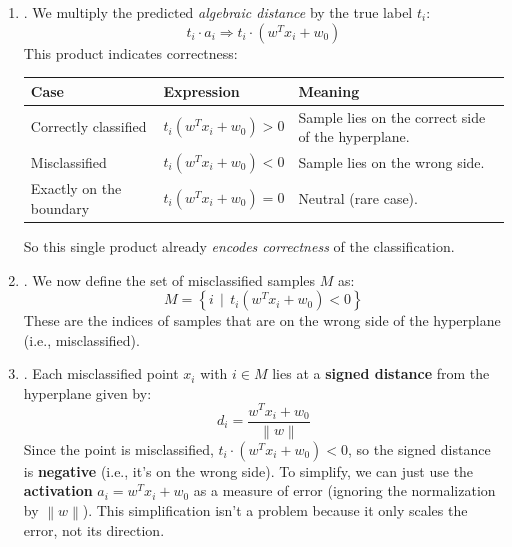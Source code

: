 \begin{enumerate}
    \item {}. We multiply the predicted \emph{algebraic distance} by the true label $t_i$:
    \begin{equation*}
        t_i \cdot a_i \Rightarrow t_i \cdot \left(w^{T} x_i + w_{0}\right)
    \end{equation*}
    This product indicates correctness:
    \begin{table}[!htp]
        \centering
        \begin{tabular}{@{} l l p{12em} @{}}
            \toprule
            \textbf{Case} & \textbf{Expression} & \textbf{Meaning} \\
            \midrule
            Correctly classified    & $t_i \left(w^{T} x_{i} + w_0\right) > 0$ & Sample lies on the correct side of the hyperplane. \\[.3em]
            Misclassified           & $t_i \left(w^{T} x_{i} + w_0\right) < 0$ & Sample lies on the wrong side. \\[.3em]
            Exactly on the boundary & $t_i \left(w^{T} x_{i} + w_0\right) = 0$ & Neutral (rare case). \\
            \bottomrule
        \end{tabular}
    \end{table}

    So this single product already \emph{encodes correctness} of the classification.


    \item {}. We now define the set of misclassified samples $M$ as:
    \begin{equation*}
        M = \left\{ i \, \mid \, t_i \left(w^{T} x_{i} + w_0\right) < 0 \right\}
    \end{equation*}
    These are the indices of samples that are on the wrong side of the hyperplane (i.e., misclassified).


    \item {}. Each misclassified point $x_i$ with $i \in M$ lies at a \textbf{signed distance} from the hyperplane given by:
    \begin{equation*}
        d_i = \dfrac{w^{T} x_i + w_0}{\left\|w\right\|}
    \end{equation*}
    Since the point is misclassified, $t_i \cdot \left(w^{T} x_i + w_0\right) < 0$, so the signed distance is \textbf{negative} (i.e., it's on the wrong side). To simplify, we can just use the \textbf{activation} $a_i = w^{T} x_i + w_0$ as a measure of error (ignoring the normalization by $\left\|w\right\|$). This simplification isn't a problem because it only scales the error, not its direction.



\end{enumerate}
